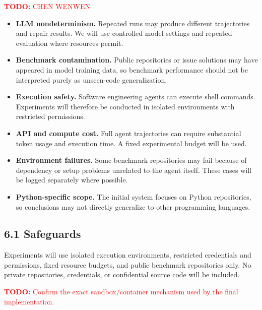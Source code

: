\documentclass[11pt]{article}
\newcommand{\todo}[1]{%
    \textcolor{red}{\textbf{TODO:} #1}%
}
\begin{document}
\todo{CHEN WENWEN}

\begin{itemize}[leftmargin=*, itemsep=0.4em]

    \item \textbf{LLM nondeterminism.}
    Repeated runs may produce different trajectories and repair results.
    We will use controlled model settings and repeated evaluation where
    resources permit.

    \item \textbf{Benchmark contamination.}
    Public repositories or issue solutions may have appeared in model
    training data, so benchmark performance should not be interpreted
    purely as unseen-code generalization.

    \item \textbf{Execution safety.}
    Software engineering agents can execute shell commands. Experiments
    will therefore be conducted in isolated environments with restricted
    permissions.

    \item \textbf{API and compute cost.}
    Full agent trajectories can require substantial token usage and
    execution time. A fixed experimental budget will be used.

    \item \textbf{Environment failures.}
    Some benchmark repositories may fail because of dependency or setup
    problems unrelated to the agent itself. These cases will be logged
    separately where possible.

    \item \textbf{Python-specific scope.}
    The initial system focuses on Python repositories, so conclusions may
    not directly generalize to other programming languages.

\end{itemize}

\subsection*{6.1 Safeguards}

Experiments will use isolated execution environments, restricted
credentials and permissions, fixed resource budgets, and public benchmark
repositories only. No private repositories, credentials, or confidential
source code will be included.

\todo{Confirm the exact sandbox/container mechanism used by the final
implementation.}






\end{document}
